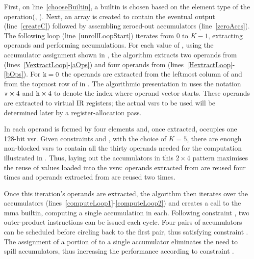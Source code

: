 \documentclass[\main/thesis.tex]{subfiles}
\begin{document}
First, on line~\ref{chooseBuiltin}, a builtin is chosen based on the element type of the operation\footnotemark (\eg {}, ).
Next, an array is created to contain the eventual output (line~\ref{createC}) followed by assembling zeroed-out accumulators (line~\ref{zeroAccs}).
The following loop (line~\ref{unrollLoopStart}) iterates from $0$ to $K-1$, extracting operands and performing accumulations.
For each value of , using the accumulator assignment shown in , the algorithm extracts two operands from  (lines~\ref{VextractLoop}-\ref{aOps}) and four operands from  (lines~\ref{HextractLoop}-\ref{bOps}).
For $\text{\code{k}}=0$ the operands are extracted from the leftmost column of  and from the topmost row of  in .
The algorithmic presentation in  uses the notation \code{ATile[}$\text{\code{v}} \times 4$\code{][k]} and \code{BTile[}$\text{\code{h}} \times 4$\code{][k]} to denote the index where operand vector starts.
These operands are extracted to virtual IR registers; the actual \glspl{vsr} to be used will be determined later by a register-allocation pass.

In  each operand is formed by four elements and, once extracted, occupies one 128-bit \gls{vsr}.
Given constraints  and , with the choice of $K = 5$, there are enough non-blocked \glspl{vsr} to contain all the thirty operands needed for the computation illustrated in .
Thus, laying out the accumulators in this $2 \times 4$ pattern maximises the reuse of values loaded into the \glspl{vsr}: operands extracted from  are reused four times and operands extracted from  are reused two times.

Once this iteration's operands are extracted, the algorithm then iterates over the accumulators (lines~\ref{computeLoop1}-\ref{computeLoop2}) and creates a call to the \gls{mma} \gls{builtin}, computing a single accumulation in each.
Following constraint , two outer-product instructions can be issued each cycle.
Four pairs of accumulators can be scheduled before circling back to the first pair, thus satisfying constraint .
The assignment of a portion of  to a single accumulator eliminates the need to spill accumulators, thus increasing the performance according to constraint .
\end{document}
